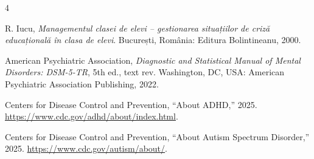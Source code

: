 \begin{thebibliography}{4}

R. Iucu, \emph{Managementul clasei de elevi -- gestionarea situațiilor de criză educațională în clasa de elevi}. București, România: Editura Bolintineanu, 2000.

American Psychiatric Association, \emph{Diagnostic and Statistical Manual of Mental Disorders: DSM-5-TR}, 5th ed., text rev. Washington, DC, USA: American Psychiatric Association Publishing, 2022.

Centers for Disease Control and Prevention, ``About ADHD,'' 2025. \url{https://www.cdc.gov/adhd/about/index.html}.

Centers for Disease Control and Prevention, ``About Autism Spectrum Disorder,'' 2025. \url{https://www.cdc.gov/autism/about/}.

\end{thebibliography}
